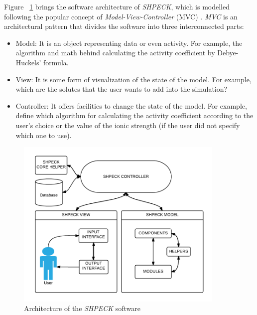 \documentclass[ppgc,mestrado,English]{iiufrgs}
\begin{document}
Figure ~\ref{fig:shpeck-architecture} brings the software architecture of \emph{SHPECK}, which is modelled following the popular concept of \emph{Model-View-Controller} (MVC) \cite{Gamma:94}. \emph{MVC} is an architectural pattern that divides the software into three interconnected parts:
\begin{itemize}
\item Model: It is an object representing data or even activity. For example, the algorithm and math behind calculating the activity coefficient by Debye-Huckels' formula.
\item View: It is some form of visualization of the state of the model. For example, which are the solutes that the user wants to add into the simulation?
\item Controller: It offers facilities to change the state of the model. For example, define which algorithm for calculating the activity coefficient according to the user's choice or the value of the ionic strength (if the user did not specify which one to use).
\end{itemize}

\begin{figure}[ht!]
\centering
\includegraphics[width=100mm]{shpeck-architecture.png}
\caption{Architecture of the \emph{SHPECK} software}
\label{fig:shpeck-architecture}
\end{figure}
\end{document}
